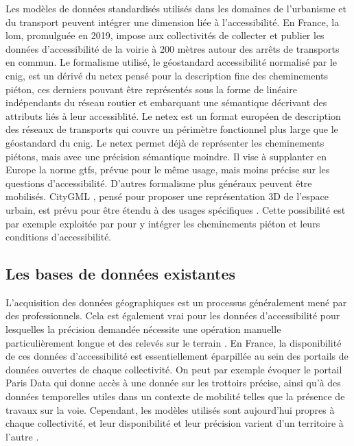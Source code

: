 
\newpar{}


Les modèles de données standardisés utilisés dans les domaines de l'urbanisme et du transport peuvent intégrer une dimension liée à l'accessibilité. En France, la \gls{lom}, promulguée en 2019, impose aux collectivités de collecter et publier les données d'accessibilité de la voirie à 200 mètres autour des arrêts de transports en commun. Le formalisme utilisé, le géostandard accessibilité normalisé par le \gls{cnig}, est un dérivé du \gls{netex} pensé pour la description fine des cheminements piéton, ces derniers pouvant être représentés sous la forme de linéaire indépendants du réseau routier et embarquant une sémantique décrivant des attributs liés à leur accessiblité. Le \gls{netex} est un format européen de description des réseaux de transports qui couvre un périmètre fonctionnel plus large que le géostandard du \gls{cnig}. Le \gls{netex} permet déjà de représenter les cheminements piétons, mais avec une précision sémantique moindre. Il vise à supplanter en Europe la norme \gls{gtfs}, prévue pour le même usage, mais moins précise sur les questions d'accessibilité. D'autres formalisme plus généraux peuvent être mobilisés. CityGML \citep{Groeger2012}, pensé pour proposer une représentation 3D de l'espace urbain, est prévu pour être étendu à des usages spécifiques \citep{Biljecki2018}. Cette possibilité est par exemple exploitée par \citet{Wheeler2020} pour y intégrer les cheminements piéton et leurs conditions d'accessibilité.

\subsection{Les bases de données existantes}


L'acquisition des données géographiques est un processus généralement mené par des professionnels. Cela est également vrai pour les données d'accessibilité pour lesquelles la précision demandée nécessite une opération manuelle particulièrement longue et des relevés sur le terrain \citep{Beale2006}. En France, la disponibilité de ces données d'accessibilité est essentiellement éparpillée au sein des portails de données ouvertes de chaque collectivité. On peut par exemple évoquer le portail Paris Data qui donne accès à une donnée sur les trottoirs précise, ainsi qu'à des données temporelles utiles dans un contexte de mobilité telles que la présence de travaux sur la voie. Cependant, les modèles utilisés sont aujourd'hui propres à chaque collectivité, et leur disponibilité et leur précision varient d'un territoire à l'autre \citep{Ding2014}.

